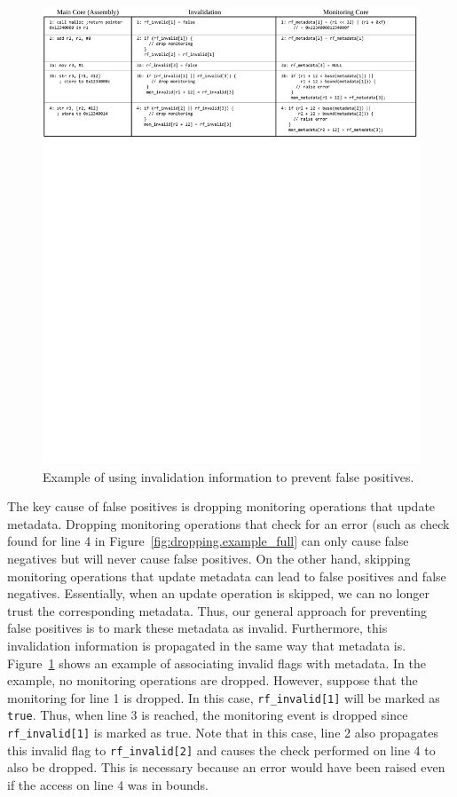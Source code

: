 \begin{figure}
  \begin{center}
    \includegraphics[]{figs/example_invalid.pdf}
    \caption{Example of using invalidation information to prevent false positives.}
    \label{fig:dropping.example_invalid}
    \vspace{-0.1in}
  \end{center}
\end{figure}

The key cause of false positives is dropping monitoring operations that update
metadata. Dropping monitoring operations that check for an error (such as check
found for line 4 in Figure~\ref{fig:dropping.example_full} can only cause
false negatives but will never cause false positives. On the other hand,
skipping monitoring operations that update metadata can lead to false positives
and false negatives.
Essentially, when an update operation is skipped, we can no longer trust the
corresponding metadata. Thus, our general approach for preventing false positives is to mark these metadata as
invalid. Furthermore, this invalidation information is propagated in the same
way that metadata is. Figure~\ref{fig:dropping.example_invalid}
shows an example of associating invalid flags with metadata. In the example, no
monitoring operations are dropped. However, suppose that the monitoring for
line 1 is dropped. In this case, {\tt rf\_invalid[1]} will be marked as {\tt
true}. Thus, when line 3 is reached, the monitoring event is dropped
since {\tt rf\_invalid[1]} is marked as true. Note that in this case, line 2
also propagates this invalid flag to {\tt rf\_invalid[2]} and causes the check
performed on line 4 to also be dropped. This is necessary because an error
would have been raised even if the access on line 4 was in bounds.

